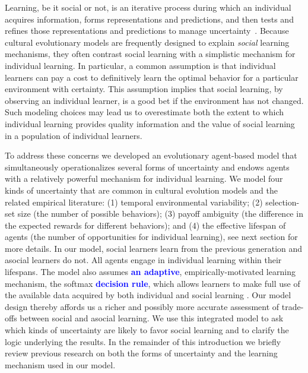 \documentclass[letterpaper,11.5pt]{scrartcl}
\newcommand{\edit}[1]{{\bfseries \textcolor{blue} {#1}}}
\begin{document}
Learning, be it social or not, is an iterative process during which an individual acquires information, forms representations and predictions, and then tests and refines those representations and predictions to manage uncertainty~\citep{jacobs2011bayesian,clark2013whatever}. Because cultural evolutionary models are frequently designed to explain \emph{social} learning mechanisms, they often contrast social learning with a simplistic mechanism for individual learning. In particular, a common assumption is that individual learners can pay a cost to definitively learn the optimal behavior for a particular environment with certainty. This assumption implies that social learning, by observing an individual learner, is a good bet if the environment has not changed. Such modeling choices may lead us to overestimate both the extent to which individual learning provides quality information and the value of social learning in a population of individual learners. %

To address these concerns we developed an evolutionary agent-based model that
simultaneously operationalizes several forms of uncertainty and endows agents
with a relatively powerful mechanism for individual learning. We model four kinds of
uncertainty that are common in cultural evolution models and the related empirical
literature:  (1) temporal environmental variability; (2) selection-set size (the number of possible behaviors); (3) payoff ambiguity
(the difference in the expected rewards for different behaviors); and (4) the effective lifespan of agents (the number of
opportunities for individual learning), see next section for more details. In our model, social learners learn from the previous
generation and asocial learners do not. All agents engage in individual learning
within their lifespans. The model also assumes \edit{an adaptive},
empirically-motivated learning mechanism, the softmax \edit{decision rule}, which allows learners to make full use of the available data acquired by both individual and social learning \citep{SuttonBartoBook}. Our model design thereby affords us a richer and possibly more accurate assessment of trade-offs between social and asocial learning. We use this integrated model to ask which kinds of uncertainty are likely to favor social learning and to clarify the logic underlying the results.
In the remainder of this introduction we briefly review previous research on both the forms of uncertainty and the learning mechanism used in our model. 
\end{document}
